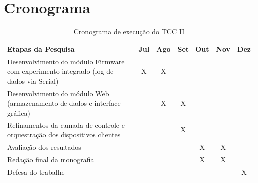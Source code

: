 \chapter[Cronograma]{Cronograma}

\begin{table}[htb]
  \renewcommand{\arraystretch}{1.5}
  \ABNTEXfontereduzida
  \centering
  \caption{Cronograma de execução do TCC II}
  \label{tab-cronograma}
  \begin{tabular}{p{8cm} c c c c c c}
    \hline
    \textbf{Etapas da Pesquisa} & \textbf{Jul} & \textbf{Ago} & \textbf{Set} & \textbf{Out} & \textbf{Nov} & \textbf{Dez} \\
    \hline
    Desenvolvimento do módulo Firmware com experimento integrado (log de dados via Serial) & X & X  &   &   &   &   \\ \hline
    Desenvolvimento do módulo Web (armazenamento de dados e interface gráfica) &   & X &  X &   &   &   \\ \hline
    Refinamentos da camada de controle e orquestração dos dispositivos clientes &   &   & X &   &   &   \\ \hline
    Avaliação dos resultados &   &   &   & X & X &   \\ \hline
    Redação final da monografia &   &   &   & X & X &   \\ \hline
    Defesa do trabalho &   &   &   &   &   & X \\ \hline
  \end{tabular}
\end{table}
